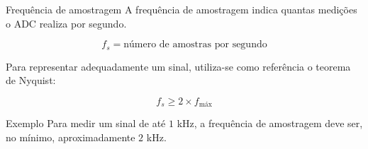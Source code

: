 \begin{frame}{Frequência de amostragem}
    A frequência de amostragem indica quantas medições o ADC realiza por segundo.

    \[
        f_s = \text{número de amostras por segundo}
    \]

    Para representar adequadamente um sinal, utiliza-se como referência o
    teorema de Nyquist:

    \[
        f_s \geq 2 \times f_{\text{máx}}
    \]

    \begin{exampleblock}{Exemplo}
        Para medir um sinal de até $1$ kHz, a frequência de amostragem deve ser,
        no mínimo, aproximadamente $2$ kHz.
    \end{exampleblock}
\end{frame}